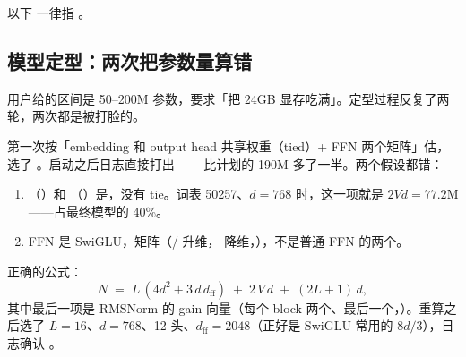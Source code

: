 以下  一律指 。

\subsection{模型定型：两次把参数量算错}
\label{subsec:params}

用户给的区间是 50--200M 参数，要求「把 24GB 显存吃满」。定型过程反复了两轮，两次都是被打脸的。

第一次按「embedding 和 output head 共享权重（tied）+ FFN 两个矩阵」估，选了 。启动之后日志直接打出 ——比计划的 190M 多了一半。两个假设都错：

\begin{enumerate}[label=(\arabic*)]\itemsep2pt
  \item {}（）和 （）是，没有 tie。词表 50257、$d=768$ 时，这一项就是 $2Vd = 77.2$M——占最终模型的 40\%。
  \item FFN 是 SwiGLU，矩阵（/ 升维， 降维，），不是普通 FFN 的两个。
\end{enumerate}

正确的公式：
\[
N \;=\; L\,(4d^{2} + 3\,d\,d_{\mathrm{ff}}) \;+\; 2\,V\,d \;+\; (2L+1)\,d ,
\]
其中最后一项是 RMSNorm 的 gain 向量（每个 block 两个、最后一个，）。重算之后选了 $L=16$、$d=768$、12 头、$d_{\mathrm{ff}}=2048$（正好是 SwiGLU 常用的 $8d/3$），日志确认 。

